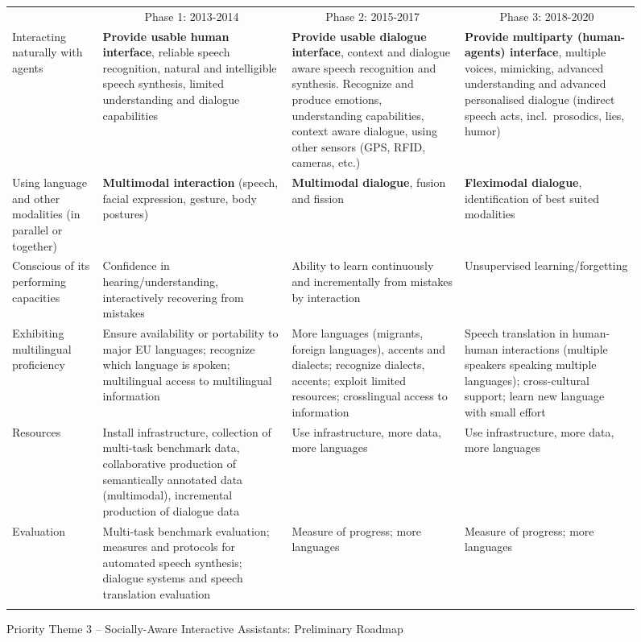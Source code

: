 \documentclass[10pt, plain]{../../metanetpaper}
\begin{document}
\begin{multicols}{2}
\begin{figure}[htbp]
  \centering
  \small
  \begin{tabular}{@{}p{2.5cm}p{4cm}p{4cm}p{4cm}@{}} \toprule\addlinespace
    \multicolumn{1}{c}{Research Priority} & \multicolumn{1}{c}{Phase 1: 2013-2014} & \multicolumn{1}{c}{Phase 2: 2015-2017} & \multicolumn{1}{c}{Phase 3: 2018-2020} \\ \addlinespace\midrule\addlinespace
    Interacting naturally with agents & \textbf{Provide usable human interface}, reliable speech recognition, natural and intelligible speech synthesis, limited understanding and dialogue capabilities & \textbf{Provide usable dialogue interface}, context and dialogue aware speech recognition and synthesis. Recognize and produce emotions,  understanding capabilities, context aware dialogue, using other sensors (GPS, RFID, cameras, etc.) & \textbf{Provide multiparty (human-agents) interface}, multiple voices, mimicking, advanced understanding and advanced  personalised dialogue (indirect speech acts, incl.~prosodics, lies, humor) \\ \addlinespace
    Using language and other modalities (in parallel or together) & \textbf{Multimodal interaction} (speech, facial expression, gesture, body postures) & \textbf{Multimodal dialogue}, fusion and fission & \textbf{Fleximodal dialogue}, identification of best suited modalities \\ \addlinespace
    Conscious of its performing capacities & Confidence in hearing/understanding, interactively recovering from mistakes & Ability to learn continuously and incrementally from mistakes by interaction & Unsupervised learning/forgetting \\ \addlinespace
    Exhibiting multilingual proficiency & Ensure availability or portability to major EU languages; recognize which language is spoken; multilingual access to multilingual information & More languages (migrants, foreign languages), accents and dialects; recognize dialects, accents; exploit limited resources; crosslingual access to information & Speech translation in human-human interactions (multiple speakers speaking multiple languages); cross-cultural support; learn new language with small effort \\ \addlinespace
    Resources & Install infrastructure, collection of multi-task benchmark data, collaborative production of semantically annotated data (multimodal), incremental production of dialogue data & Use infrastructure, more data, more languages & Use infrastructure, more data, more languages \\ \addlinespace
    Evaluation & Multi-task benchmark evaluation; measures and protocols for automated speech synthesis; dialogue systems and speech translation evaluation & Measure of progress; more languages & Measure of progress; more languages \\ \addlinespace\bottomrule
  \end{tabular}
  \caption{Priority Theme 3 -- Socially-Aware Interactive Assistants: Preliminary Roadmap}
  \label{fig:pt3-roadmap}
\end{figure}


\end{multicols}
\end{document}
